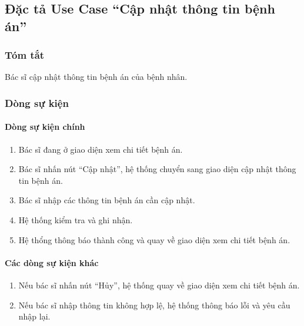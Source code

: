 \subsection{Đặc tả Use Case ``Cập nhật thông tin bệnh án''}

\subsubsection{Tóm tắt}
Bác sĩ cập nhật thông tin bệnh án của bệnh nhân.

\subsubsection{Dòng sự kiện}
\paragraph{\textbf{Dòng sự kiện chính}}
\begin{enumerate}
  \item Bác sĩ đang ở giao diện xem chi tiết bệnh án.
  \item Bác sĩ nhấn nút ``Cập nhật'', hệ thống chuyển sang giao diện cập nhật thông tin bệnh án.
  \item Bác sĩ nhập các thông tin bệnh án cần cập nhật.
  \item Hệ thống kiểm tra và ghi nhận.
  \item Hệ thổng thông báo thành công và quay về giao diện xem chi tiết bệnh án.
\end{enumerate}

\paragraph{\textbf{Các dòng sự kiện khác}}
\begin{enumerate}
  \item Nếu bác sĩ nhấn nút ``Hủy'', hệ thống quay về giao diện xem chi tiết bệnh án.
  \item Nếu bác sĩ nhập thông tin không hợp lệ, hệ thống thông báo lỗi và yêu cầu nhập lại.
\end{enumerate}

